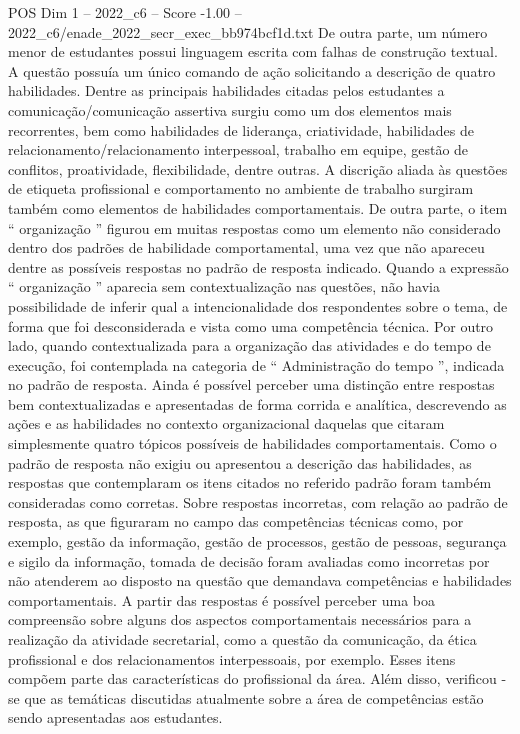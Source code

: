 \begin{textsample}{POS Dim 1 – 2022\_c6 – Score -1.00 – 2022\_c6/enade\_2022\_secr\_exec\_bb974bcf1d.txt}
De outra parte, um número menor de estudantes possui linguagem escrita com falhas de construção textual.
A questão possuía um único comando de ação solicitando a descrição de quatro habilidades.
Dentre as principais habilidades citadas pelos estudantes a comunicação/comunicação assertiva surgiu como um dos elementos mais recorrentes, bem como habilidades de liderança, criatividade, habilidades de relacionamento/relacionamento interpessoal, trabalho em equipe, gestão de conflitos, proatividade, flexibilidade, dentre outras.
A discrição aliada às questões de etiqueta profissional e comportamento no ambiente de trabalho surgiram também como elementos de habilidades comportamentais.
De outra parte, o item “ organização ” figurou em muitas respostas como um elemento não considerado dentro dos padrões de habilidade comportamental, uma vez que não apareceu dentre as possíveis respostas no padrão de resposta indicado.
Quando a expressão “ organização ” aparecia sem contextualização nas questões, não havia possibilidade de inferir qual a intencionalidade dos respondentes sobre o tema, de forma que foi desconsiderada e vista como uma competência técnica.
Por outro lado, quando contextualizada para a organização das atividades e do tempo de execução, foi contemplada na categoria de “ Administração do tempo ”, indicada no padrão de resposta.
Ainda é possível perceber uma distinção entre respostas bem contextualizadas e apresentadas de forma corrida e analítica, descrevendo as ações e as habilidades no contexto organizacional daquelas que citaram simplesmente quatro tópicos possíveis de habilidades comportamentais.
Como o padrão de resposta não exigiu ou apresentou a descrição das habilidades, as respostas que contemplaram os itens citados no referido padrão foram também consideradas como corretas.
Sobre respostas incorretas, com relação ao padrão de resposta, as que figuraram no campo das competências técnicas como, por exemplo, gestão da informação, gestão de processos, gestão de pessoas, segurança e sigilo da informação, tomada de decisão foram avaliadas como incorretas por não atenderem ao disposto na questão que demandava competências e habilidades comportamentais.
A partir das respostas é possível perceber uma boa compreensão sobre alguns dos aspectos comportamentais necessários para a realização da atividade secretarial, como a questão da comunicação, da ética profissional e dos relacionamentos interpessoais, por exemplo.
Esses itens compõem parte das características do profissional da área.
Além disso, verificou -se que as temáticas discutidas atualmente sobre a área de competências estão sendo apresentadas aos estudantes.

\end{textsample}
